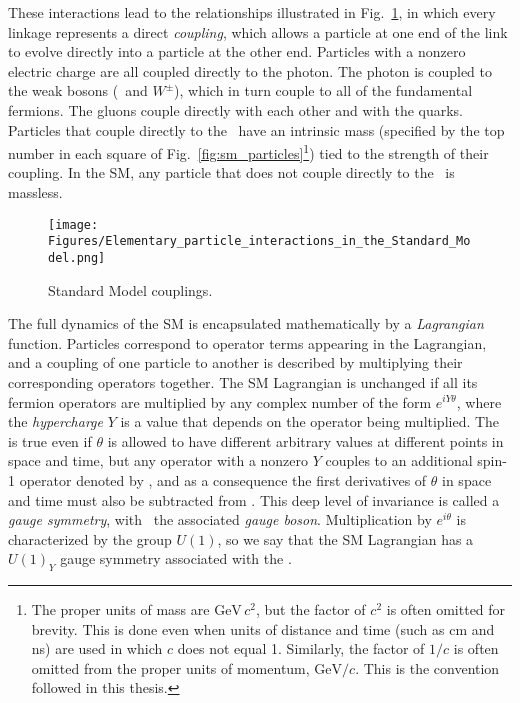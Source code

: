 These interactions lead to the relationships illustrated in Fig.~\ref{fig:sm_interactions}, in which every linkage represents
a direct \textit{coupling}, which allows a particle at one end of the link to evolve directly into a particle at the other end.
Particles with a nonzero electric charge are all coupled directly to the photon. The photon is coupled to the weak bosons
(\PZ\ and $W^\pm$), which in turn couple to all of the fundamental fermions. The gluons couple directly with each other and with the quarks.
Particles that couple directly to the \PH\ have an intrinsic mass (specified by the top number in each square of Fig.~\ref{fig:sm_particles}\footnote{The
proper units of mass are $\mathrm{GeV}\,c^{2}$, but the factor of $c^{2}$ is often omitted for brevity. This is done even when units of distance and
time (such as cm and ns) are used in which $c$ does not equal 1. Similarly, the factor of $1/c$ is often omitted from the proper units of momentum,
$\mathrm{GeV}/c$. This is the convention followed in this thesis.}) tied to the strength of their coupling.
In the SM, any particle that does not couple directly to the \PH\ is massless.

\begin{figure}[hbtp]
  \begin{center}
    \texttt{[image: Figures/Elementary\_particle\_interactions\_in\_the\_Standard\_Model.png]}
    \caption{
      Standard Model couplings.
    }
    \label{fig:sm_interactions}
  \end{center}
\end{figure}

The full dynamics of the SM is encapsulated mathematically by a \textit{Lagrangian} function. Particles correspond to operator
terms appearing in the Lagrangian, and a coupling of one particle to another is described by multiplying their
corresponding operators together. The SM Lagrangian is unchanged
if all its fermion operators are multiplied by any complex number of the form $e^{iY\theta}$, where the \textit{hypercharge} $Y$ is a value that depends
on the operator being multiplied. The is true even if $\theta$ is allowed to have different arbitrary values at
different points in space and time, but any operator with a nonzero $Y$ couples to an additional spin-1 operator denoted by \PB,
and as a consequence the first derivatives of $\theta$ in space and time must also be subtracted from \PB.
This deep level of invariance is called a \textit{gauge symmetry}, with \PB\ the associated \textit{gauge boson}.
Multiplication by $e^{i\theta}$ is characterized by the group $U(1)$, so we say that the SM Lagrangian has a
$U(1)_{Y}$ gauge symmetry associated with the \PB.

